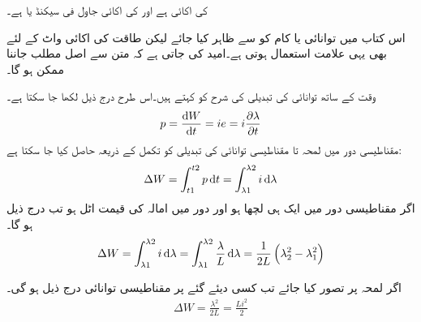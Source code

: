   کی اکائی   ہے اور   کی اکائی جاول فی سیکنڈ یا    ہے۔

اس کتاب میں توانائی یا کام کو  سے ظاہر کیا جائے لیکن طاقت کی اکائی واٹ  کے لئے بھی یہی علامت استعمال ہوتی ہے۔امید کی جاتی ہے کہ متن سے  اصل مطلب جاننا ممکن ہو گا۔

وقت کے ساتھ توانائی کی تبدیلی کی شرح کو  کہتے ہیں۔اس طرح درج ذیل لکھا جا سکتا ہے۔
\begin{align}
p=\frac{\dif W}{\dif t} = ie = i \frac{\partial \lambda}{\partial t}
\end{align} 
مقناطیسی دور میں  لمحہ  تا   مقناطیسی توانائی کی تبدیلی کو تکمل کے ذریعہ حاصل کیا جا سکتا ہے:
\begin{align}
\Delta W = \int_{t1}^{t2} p \dif t =\int_{\lambda1}^{\lambda2} i \dif \lambda
\end{align}
اگر مقناطیسی دور میں ایک ہی لچھا ہو اور دور میں امالہ کی قیمت اٹل ہو تب درج ذیل ہو گا۔
\begin{align}
\Delta W = \int_{\lambda1}^{\lambda2} i \dif \lambda=\int_{\lambda1}^{\lambda2} \frac{\lambda}{L} \dif \lambda=\frac{1}{2 L} \left(\lambda_2^2-\lambda_1^2 \right)
\end{align}

اگر لمحہ  پر  تصور کیا جائے تب کسی دیئے گئے  پر مقناطیسی توانائی درج ذیل ہو گی۔
\begin{align}
\Delta W=\frac{\lambda^2}{2L}=\frac{L i^2}{2}
\end{align}


